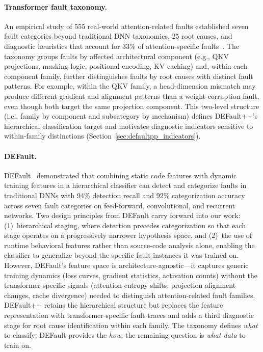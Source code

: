 \paragraph{Transformer fault taxonomy.}
An empirical study of 555 real-world attention-related faults established seven fault categories beyond traditional DNN taxonomies, 25 root causes, and diagnostic heuristics that account for 33\% of attention-specific faults~\cite{attention_taxonomy}. The taxonomy groups faults by affected architectural component (e.g., QKV projections, masking logic, positional encoding, KV caching) and, within each component family, further distinguishes faults by root causes with distinct fault patterns. For example, within the QKV family, a head-dimension mismatch may produce different gradient and alignment patterns than a weight-corruption fault, even though both target the same projection component. This two-level structure (i.e., family by component and subcategory by mechanism) defines DEFault++'s hierarchical classification target and motivates diagnostic indicators sensitive to within-family distinctions (Section~\ref{sec:defaultpp_indicators}).

\paragraph{DEFault.}
DEFault~\cite{default} demonstrated that combining static code features with dynamic training features in a hierarchical classifier can detect and categorize faults in traditional DNNs with 94\% detection recall and 92\% categorization accuracy across seven fault categories on feed-forward, convolutional, and recurrent networks. Two design principles from DEFault carry forward into our work: (1)~hierarchical staging, where detection precedes categorization so that each stage operates on a progressively narrower hypothesis space, and (2)~the use of runtime behavioral features rather than source-code analysis alone, enabling the classifier to generalize beyond the specific fault instances it was trained on. However, DEFault's feature space is architecture-agnostic---it captures generic training dynamics (loss curves, gradient statistics, activation counts) without the transformer-specific signals (attention entropy shifts, projection alignment changes, cache divergence) needed to distinguish attention-related fault families. DEFault++ retains the hierarchical structure but replaces the feature representation with transformer-specific fault traces and adds a third diagnostic stage for root cause identification within each family. The taxonomy defines \emph{what} to classify; DEFault provides the \emph{how}; the remaining question is \emph{what data} to train on.

